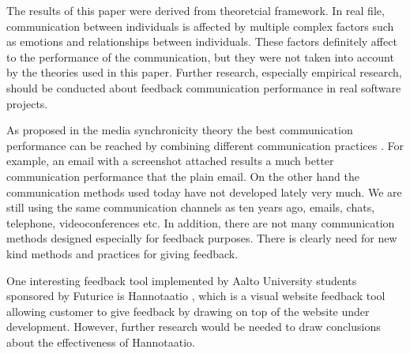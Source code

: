 \documentclass[conference]{IEEEtran}
\begin{document}
The results of this paper were derived from theoretcial framework. In real file, communication between individuals is affected by multiple complex factors such as emotions and relationships between individuals. These factors definitely affect to the performance of the communication, but they were not taken into account by the theories used in this paper. Further research, especially empirical research, should be conducted about feedback communication performance in real software projects.

As proposed in the media synchronicity theory the best communication performance can be reached by combining different communication practices \cite{2008dennis}. For example, an email with a screenshot attached results a much better communication performance that the plain email. On the other hand the communication methods used today have not developed lately very much. We are still using the same communication channels as ten years ago, emails, chats, telephone, videoconferences etc. In addition, there are not many communication methods designed especially for feedback purposes. There is clearly need for new kind methods and practices for giving feedback.

One interesting feedback tool implemented by Aalto University students sponsored by Futurice is Hannotaatio \cite{hannotaatio}, which is a visual website feedback tool allowing customer to give feedback by drawing on top of the website under development. However, further research would be needed to draw conclusions about the effectiveness of Hannotaatio.

%
%
\end{document}

